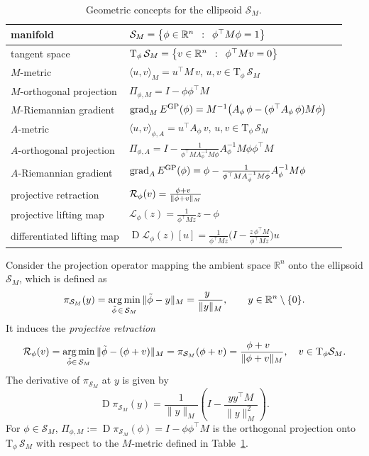 \documentclass[11pt,reqno]{amsart}
\theoremstyle{plain}
\newcommand\R{\mathbb R}
\DeclareMathOperator{\Drm}{D}
\DeclareMathOperator{\grad}{grad}
\DeclareMathOperator*{\argmin}{arg\,min}
\newcommand\calS{\mathcal S}
\newcommand{\Tan}{\mathrm{T}}
\newcommand{\Ret}{\mathcal R}
\newcommand{\invRet}{\mathcal L}
\newcommand{\GP}{{\rm GP}}
\begin{document}
	\begin{table}
		\begin{tabular}{lll}
			\toprule 
			manifold & $\calS_{M}=\big\{ \phi\in\mathbb{R}^{n}\enskip:\enskip \phi^{\top}M\phi=1\big\}$
			\tabularnewline
			\midrule 
			tangent space & $\Tan_\phi\,\calS_M = \big\{ v\in\R^n \enskip :\enskip \phi^\top Mv=0 \big\}$
			\tabularnewline
			\midrule 
			$M$-metric & $\langle u,v\rangle_{M} = u^\top M\,v$, \; $u,v\in\Tan_\phi\,\calS_M$ \tabularnewline
			\midrule 
			$M$-orthogonal projection & $\Pi_{\phi,M}=I-\phi\phi^\top M$ 
			\tabularnewline
			\midrule 
			$M$-Riemannian gradient & $\grad_{M} E^{\GP}(\phi) = M^{-1}\big(A_\phi\,\phi - (\phi^\top A_\phi\,\phi)M\phi\big)$
			\tabularnewline
			\midrule 
			$A$-metric & $\langle u,v\rangle_{\phi,A} = u^\top A_{\phi}\,v$, \; $u,v\in\Tan_\phi\,\calS_M$ 
			\tabularnewline
			\midrule 
			$A$-orthogonal projection & $\Pi_{\phi,A}=I-\frac{1}{\phi^\top MA_\phi^{-1} M\phi} A_\phi^{-1}M\phi\phi^\top M$ 
			\tabularnewline
			\midrule 
			$A$-Riemannian gradient & $\grad_{A} E^{\GP}(\phi) = \phi-\frac{1}{\phi^\top MA_\phi^{-1} M\phi} A_\phi^{-1}M\phi$
			\tabularnewline
			\midrule 
			projective retraction 
			& $\Ret_\phi(v)=\frac{\phi+v\enskip}{\|\phi+v\|_{M}}$\tabularnewline
			\midrule 
			projective lifting map
			& $\invRet_\phi(z)=\frac{1}{\phi^{\top}Mz}z-\phi$\tabularnewline
			\midrule 
			differentiated lifting map
			& $\Drm\invRet_\phi(z)[u]=\frac{1}{\phi^\top Mz}\Big(I-\frac{z\,\phi^\top M}{\phi^\top Mz}\Big)u$\tabularnewline
			\bottomrule
		\end{tabular}
		\caption{Geometric concepts for the ellipsoid $\calS_M$.}
		\label{tab:ellipsoid}
	\end{table}
	
	Consider the projection operator mapping the ambient space $\R^n$ onto the ellipsoid $\calS_M$, which is defined as 
	\[
	\pi_{\calS_M}(y) = \argmin_{\tilde\phi\,\in\,\calS_M} \|\tilde\phi-y\|_{M}
	=\frac{y\enskip\,}{\|y\|_{M}}, \qquad y\in\R^n\setminus \{0\}.
	\]
	It induces the \emph{projective retraction}
	\[
	\Ret_\phi(v)
	=\argmin_{\tilde\phi\in\,\calS_M}\|\tilde\phi-(\phi+v)\|_M
	= \pi_{\calS_M}(\phi+v)
	= \frac{\phi+v\enskip\;}{\|\phi+v\|_{M}}, \quad v\in\Tan_\phi\calS_M.
	\]
	The derivative of $\pi_{\calS_M}$ at $y$ is given by 
	\[
	\Drm\pi_{\calS_M}(y)=\frac{1}{\|y\|_M} \left(I-\frac{yy^\top M}{\|y\|_M^2}\right).
	\]
	For $\phi\in\calS_M$, $\Pi_{\phi,M}:=\Drm \pi_{\calS_M}(\phi)=I-\phi\phi^\top M$ is the orthogonal projection onto $\Tan_\phi \,\calS_M$ with respect to the $M$-metric defined in Table~\ref{tab:ellipsoid}. 
	
\end{document}
